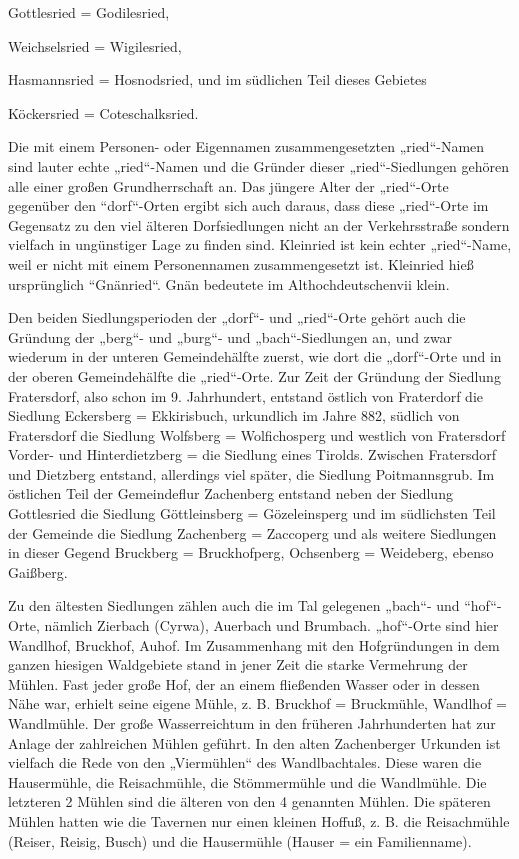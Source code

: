 \documentclass[12pt,a4pager]{book}
\begin{document}
Gottlesried = Godilesried,

Weichselsried = Wigilesried,

Hasmannsried = Hosnodsried, und im südlichen Teil dieses Gebietes

Köckersried = Coteschalksried.

Die mit einem Personen- oder Eigennamen zusammengesetzten „ried“-Namen sind
lauter echte „ried“-Namen und die Gründer dieser „ried“-Siedlungen gehören alle
einer großen Grundherrschaft an. Das jüngere Alter der „ried“-Orte gegenüber den
“dorf“-Orten ergibt sich auch daraus, dass diese „ried“-Orte im Gegensatz zu den
viel älteren Dorfsiedlungen nicht an der Verkehrsstraße sondern vielfach in
ungünstiger Lage zu finden sind. Kleinried ist kein echter „ried“-Name, weil er
nicht mit einem Personennamen zusammengesetzt ist. Kleinried hieß ursprünglich
“Gnänried“. Gnän bedeutete im Althochdeutschenvii klein.

Den beiden Siedlungsperioden der „dorf“- und „ried“-Orte gehört auch die
Gründung der „berg“- und „burg“- und „bach“-Siedlungen an, und zwar wiederum in
der unteren Gemeindehälfte zuerst, wie dort die „dorf“-Orte und in der oberen
Gemeindehälfte die „ried“-Orte. Zur Zeit der Gründung der Siedlung Fratersdorf,
also schon im 9. Jahrhundert, entstand östlich von Fraterdorf die Siedlung
Eckersberg = Ekkirisbuch, urkundlich im Jahre 882, südlich von Fratersdorf die
Siedlung Wolfsberg = Wolfichosperg und westlich von Fratersdorf Vorder- und
Hinterdietzberg = die Siedlung eines Tirolds. Zwischen Fratersdorf und Dietzberg
entstand, allerdings viel später, die Siedlung Poitmannsgrub. Im östlichen Teil
der Gemeindeflur Zachenberg entstand neben der Siedlung Gottlesried die Siedlung
Göttleinsberg = Gözeleinsperg und im südlichsten Teil der Gemeinde die Siedlung
Zachenberg = Zaccoperg und als weitere Siedlungen in dieser Gegend Bruckberg =
Bruckhofperg, Ochsenberg = Weideberg, ebenso Gaißberg.

Zu den ältesten Siedlungen zählen auch die im Tal gelegenen „bach“- und
“hof“-Orte, nämlich Zierbach (Cyrwa), Auerbach und Brumbach. „hof“-Orte sind
hier Wandlhof, Bruckhof, Auhof. Im Zusammenhang mit den Hofgründungen in dem
ganzen hiesigen Waldgebiete stand in jener Zeit die starke Vermehrung der
Mühlen. Fast jeder große Hof, der an einem fließenden Wasser oder in dessen Nähe
war, erhielt seine eigene Mühle, z. B. Bruckhof = Bruckmühle, Wandlhof =
Wandlmühle. Der große Wasserreichtum in den früheren Jahrhunderten hat zur
Anlage der zahlreichen Mühlen geführt. In den alten Zachenberger Urkunden ist
vielfach die Rede von den „Viermühlen“ des Wandlbachtales. Diese waren die
Hausermühle, die Reisachmühle, die Stömmermühle und die Wandlmühle. Die
letzteren 2 Mühlen sind die älteren von den 4 genannten Mühlen. Die späteren
Mühlen hatten wie die Tavernen nur einen kleinen Hoffuß, z. B. die Reisachmühle
(Reiser, Reisig, Busch) und die Hausermühle (Hauser = ein Familienname).
\end{document}
